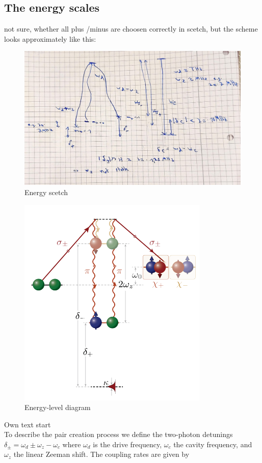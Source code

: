 \subsection{The energy scales}
not sure, whether all plus /minus are choosen correctly in scetch, but the scheme looks approximately like this:  
\begin{figure}[h!]
	\centering
	\includegraphics[width=1\linewidth]{Images/energy_scetch.jpeg}
	\caption{Energy scetch}
	\label{fig:energy_scales}
\end{figure}
\begin{figure}[h!]
	\centering
	\includegraphics[width=0.5\linewidth]{Images/fou_energies.png}
	\caption{Energy-level diagram}
	\label{fig:fou_energy_diagram}
\end{figure}
Own text start
\\
To describe the pair creation process we define the two-photon detunings $\delta_\pm = \omega_d \pm \omega_z - \omega_c$ where $\omega_d$ is the drive frequency, $\omega_c$ the cavity frequency, and $\omega_z$ the linear Zeeman shift. The coupling rates are given by
